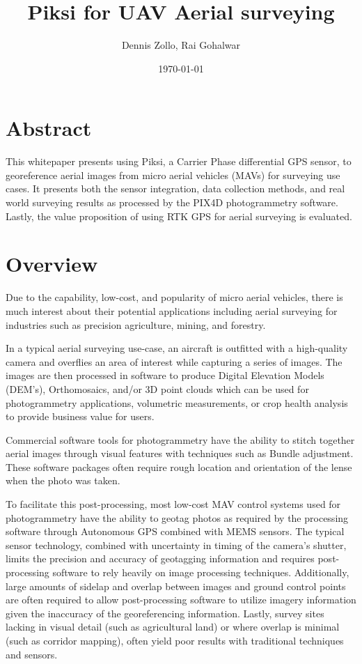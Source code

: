 \documentclass{article}
\title{Piksi for UAV Aerial surveying}
\author{Dennis Zollo, Rai Gohalwar}
\date{\today}
\begin{document}
\maketitle

\thispagestyle{firstpage}

\section{Abstract}
\label{sec:abstract}
This whitepaper presents using Piksi, a Carrier Phase differential GPS sensor, to georeference aerial images from micro aerial vehicles (MAVs) for surveying use cases.
It presents both the sensor integration, data collection methods, and real world surveying results as processed by the PIX4D photogrammetry software.  Lastly, the value proposition of using RTK GPS for aerial surveying is evaluated.
\tableofcontents
\newpage
\section{Overview}
\label{sec:Overview}
Due to the capability, low-cost, and popularity of micro aerial vehicles, there is much interest about their potential applications including aerial surveying for industries such as precision agriculture, mining, and forestry.

In a typical aerial surveying use-case, an aircraft is outfitted with a high-quality camera and overflies an area of interest while capturing a series of images.  The images are then processed in software to produce Digital Elevation Models (DEM's), Orthomosaics, and/or 3D point clouds which can be used for photogrammetry applications, volumetric measurements, or crop health analysis to provide business value for users.

Commercial software tools for photogrammetry have the ability to stitch together aerial images through visual features with techniques such as Bundle adjustment.  These software packages often require rough location and orientation of the lense when the photo was taken.

To facilitate this post-processing, most low-cost MAV control systems used for photogrammetry have the ability to geotag photos as required by the processing software through Autonomous GPS combined with MEMS sensors.  The typical sensor technology, combined with uncertainty in timing of the camera's shutter, limits the precision and accuracy of geotagging information and requires post-processing software to rely heavily on image processing techniques. Additionally, large amounts of sidelap and overlap between images and ground control points are often required to allow post-processing software to utilize imagery information given the inaccuracy of the georeferencing information.  Lastly, survey sites lacking in visual detail (such as agricultural land) or where overlap is minimal (such as corridor mapping), often yield poor results with traditional techniques and sensors.
\end{document}
